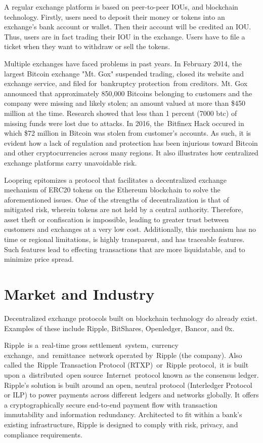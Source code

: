 \documentclass[UTF8,nofonts]{article}
\begin{document}
A regular exchange platform is based on peer-to-peer IOUs, and blockchain technology. Firstly,  users need to deposit their money or tokens into an exchange's bank account or wallet. Then their account will be credited an IOU. Thus, users are in fact trading their IOU in the exchange. Users have to file a ticket when they want to withdraw or sell the tokens.

Multiple exchanges have faced problems in past years. In February 2014, the largest Bitcoin exchange "Mt. Gox" suspended trading,  closed its website and exchange service, and filed for bankruptcy protection from creditors\cite{mcmillan2014inside}. Mt. Gox announced that approximately 850,000 Bitcoins belonging to customers and the company were missing and likely stolen; an amount valued at more than \$450 million at the time. Research showed that less than 1 percent (7000 btc) of missing funds were lost due to attacks. In 2016, the Bitfinex Hack occured in which \$72 million in Bitcoin was stolen from customer's accounts. As such, it is evident how a lack of regulation and protection has been injurious toward Bitcoin and other cryptocurrencies across many regions. It also illustrates how centralized exchange platforms carry unavoidable risk.

Loopring epitomizes a protocol that facilitates a decentralized exchange mechanism of ERC20 tokens on the Ethereum blockchain to solve the aforementioned issues. One of the strengths of decentralization is that of mitigated risk, wherein tokens are not held by a central authority. Therefore, asset theft or confiscation is impossible, leading to greater trust between customers and exchanges at a very low cost. Additionally, this mechanism has no time or regional limitations, is highly transparent, and has traceable features. Such features lead to effecting transactions that are more liquidatable, and to minimize price spread.

\section{Market and Industry\label{sec: existingworks}}

Decentralized exchange protocols built on blockchain technology do already exist. Examples of these include Ripple, BitShares, Openledger, Bancor, and 0x.

Ripple\cite{schwartz2014ripple} is a real-time gross settlement system, currency exchange, and remittance network operated by Ripple (the company). Also called the Ripple Transaction Protocol (RTXP) or Ripple protocol, it is built upon a distributed open source Internet protocol known as the consensus ledger. Ripple's solution is built around an open, neutral protocol (Interledger Protocol or ILP\cite{thomas2015protocol}) to power payments across different ledgers and networks globally. It offers a cryptographically secure end-to-end payment flow with transaction immutability and information redundancy. Architected to fit within a bank's existing infrastructure, Ripple is designed to comply with risk, privacy, and compliance requirements.
\end{document}
